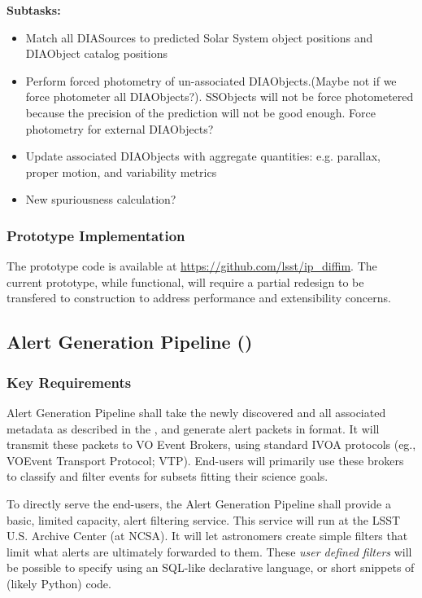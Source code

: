 \noindent
{\bf Subtasks:}
\begin{itemize}
\item Match all DIASources to predicted Solar System object positions and DIAObject catalog positions
\item Perform forced photometry of un-associated DIAObjects.(Maybe not if we force photometer all DIAObjects?).
SSObjects will not be force photometered because
the precision of the prediction will not be good enough.  Force photometry for external DIAObjects?
\item Update associated DIAObjects with aggregate quantities: e.g. parallax, proper motion, and variability
metrics
\item New spuriousness calculation?
\end{itemize}

\subsubsection{Prototype Implementation}

The prototype code is available at \url{https://github.com/lsst/ip_diffim}. The current prototype, while functional, will require a partial redesign to be transfered to construction to address performance and extensibility concerns.

\clearpage

\subsection{Alert Generation Pipeline (\wbsAP)}

\subsubsection{Key Requirements}

Alert Generation Pipeline shall take the newly discovered \DIASources and all associated metadata as described
in the \DPDD, and generate alert packets in \VOEvent format. It will transmit these packets to VO Event
Brokers, using standard IVOA protocols (eg., VOEvent Transport Protocol; VTP\@). End-users will primarily use these brokers to classify and filter events for subsets fitting their science goals.

To directly serve the end-users, the Alert Generation Pipeline shall provide a basic, limited capacity, alert filtering service. This service will run at the LSST U.S. Archive Center (at NCSA). It will let astronomers create simple filters that limit what alerts are ultimately forwarded to them. These \emph{user defined filters} will be possible to specify using an SQL-like declarative language, or short snippets of (likely Python) code.


